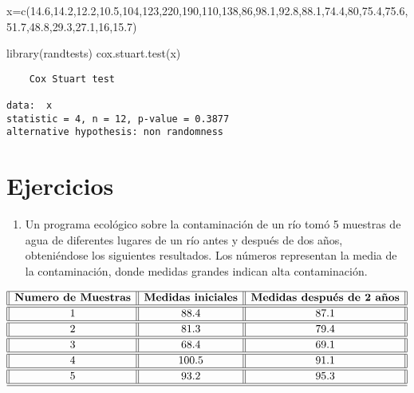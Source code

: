 \documentclass[
  a4paper,
  oneside,
  openany]{book}
\newenvironment{Shaded}{\begin{snugshade}}{\end{snugshade}}
\newcommand{\DecValTok}[1]{\textcolor[rgb]{0.00,0.00,0.81}{#1}}
\newcommand{\FloatTok}[1]{\textcolor[rgb]{0.00,0.00,0.81}{#1}}
\newcommand{\FunctionTok}[1]{\textcolor[rgb]{0.00,0.00,0.00}{#1}}
\newcommand{\NormalTok}[1]{#1}
\newcommand{\OtherTok}[1]{\textcolor[rgb]{0.56,0.35,0.01}{#1}}
\providecommand{\tightlist}{%
  \setlength{\itemsep}{0pt}\setlength{\parskip}{0pt}}
\begin{document}
\begin{Shaded}
\begin{Highlighting}[]
\NormalTok{x}\OtherTok{=}\FunctionTok{c}\NormalTok{(}\FloatTok{14.6}\NormalTok{,}\FloatTok{14.2}\NormalTok{,}\FloatTok{12.2}\NormalTok{,}\FloatTok{10.5}\NormalTok{,}\DecValTok{104}\NormalTok{,}\DecValTok{123}\NormalTok{,}\DecValTok{220}\NormalTok{,}\DecValTok{190}\NormalTok{,}\DecValTok{110}\NormalTok{,}\DecValTok{138}\NormalTok{,}\DecValTok{86}\NormalTok{,}\FloatTok{98.1}\NormalTok{,}\FloatTok{92.8}\NormalTok{,}\FloatTok{88.1}\NormalTok{,}\FloatTok{74.4}\NormalTok{,}\DecValTok{80}\NormalTok{,}\FloatTok{75.4}\NormalTok{,}\FloatTok{75.6}\NormalTok{,}\FloatTok{51.7}\NormalTok{,}\FloatTok{48.8}\NormalTok{,}\FloatTok{29.3}\NormalTok{,}\FloatTok{27.1}\NormalTok{,}\DecValTok{16}\NormalTok{,}\FloatTok{15.7}\NormalTok{)}


\FunctionTok{library}\NormalTok{(randtests)}
\FunctionTok{cox.stuart.test}\NormalTok{(x)}
\end{Highlighting}
\end{Shaded}

\begin{verbatim}
    Cox Stuart test

data:  x
statistic = 4, n = 12, p-value = 0.3877
alternative hypothesis: non randomness
\end{verbatim}

\hypertarget{ejercicios-4}{%
\section{Ejercicios}\label{ejercicios-4}}

\begin{enumerate}
\def\labelenumi{\arabic{enumi}.}
\tightlist
\item
  Un programa ecológico sobre la contaminación de un río tomó 5 muestras de agua de diferentes lugares de un río antes y después de dos años, obteniéndose los siguientes resultados. Los números representan la media de la contaminación, donde medidas grandes indican alta contaminación.
\end{enumerate}

\[
\begin{array}{||c| |c| |c||} 
\hline 
\textbf{Numero de Muestras} & \textbf{Medidas iniciales} & \textbf{Medidas después de 2 años}  \\  
\hline
\hline
1 &88.4& 87.1 \\
\hline
\hline
2& 81.3 &79.4 \\
\hline
\hline
3 &68.4 & 69.1 \\
\hline
\hline
4 &100.5& 91.1 \\
\hline
\hline
5 & 93.2&95.3 \\
\hline
\hline
\end{array}
\]
\end{document}
